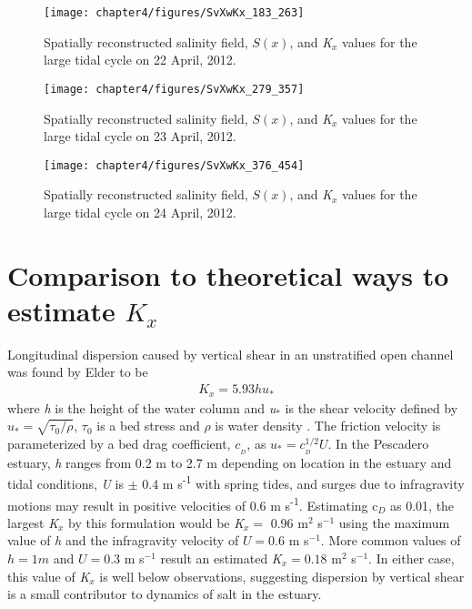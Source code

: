 \begin{figure}[hp]
\centering
	\texttt{[image: chapter4/figures/SvXwKx\_183\_263]} 
\caption{Spatially reconstructed salinity field, $S(x)$, and \emph{K$_x$} values for the large tidal cycle on 22 April, 2012. } \label{fig:Kx422}
\end{figure}

\begin{figure}[hp]
\centering
	\texttt{[image: chapter4/figures/SvXwKx\_279\_357]} 
\caption{Spatially reconstructed salinity field, $S(x)$, and \emph{K$_x$} values for the large tidal cycle on 23 April, 2012. } \label{fig:Kx423}
\end{figure}

\begin{figure}[hp]
\centering
	\texttt{[image: chapter4/figures/SvXwKx\_376\_454]} 
\caption{Spatially reconstructed salinity field, $S(x)$, and \emph{K$_x$} values for the large tidal cycle on 24 April, 2012.} \label{fig:Kx424}
\end{figure}




\section{Comparison to theoretical ways to estimate $K_x$}

Longitudinal dispersion caused by vertical shear in an unstratified open channel was found by Elder to be
\begin{eqnarray}
K_x = 5.93hu_* \label{eq:Kshear}
\end{eqnarray}
where \emph{h} is the height of the water column and \emph{u$_*$} is the shear velocity defined by $u_*=\sqrt{\tau_0/\rho}$, $\tau_0$ is a bed stress and $\rho$ is water density \parencite*{elder_dispersion_1959}. The friction velocity is parameterized by a bed drag coefficient, $c_{_D}$, as $u_* = c_{_D}^{1/2}U$. In the Pescadero estuary, \emph{h} ranges from 0.2 m to 2.7 m depending on location in the estuary and tidal conditions, \emph{U} is $\pm$ 0.4 m s\textsuperscript{-1} with spring tides, and surges due to infragravity motions may result in positive velocities of 0.6 m s\textsuperscript{-1}. Estimating c$_D$ as 0.01, the largest \emph{K$_x$} by this formulation would be \emph{K}$_x =$ 0.96 m$^2$ s$^{-1}$ using the maximum value of \emph{h} and the infragravity velocity of $U = 0.6$ m s$^{-1}$. More common values of $h = 1 m$ and $U = 0.3$ m s$^{-1}$ result an estimated \emph{K}$_x = 0.18$ m$^2$ s$^{-1}$. In either case, this value of \emph{K$_x$} is well below observations, suggesting dispersion by vertical shear is a small contributor to dynamics of salt in the estuary.

